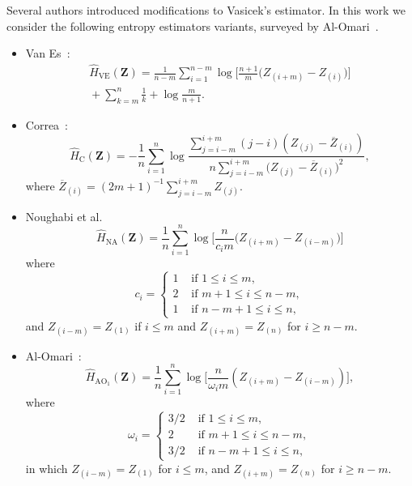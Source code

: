 \documentclass[journal]{IEEEtran}
\begin{document}
Several authors introduced modifications to Vasicek's estimator. 
In this work we consider the following entropy estimators variants, surveyed by Al-Omari~\cite{AlOmari2016}. 
\begin{itemize}
	\item Van Es~\cite{VanEs92}:
	\begin{multline}
		\label{HVE}
		\widehat{H}_\text{VE}(\bm Z)=\frac{1}{n-m} \sum_{i=1}^{n-m}\log{\Big[\frac{n+1}{m}\big(Z_{(i+m)}-Z_{(i)}\big)\Big]} \\
		\mbox{}+\sum_{k=m}^{n} \frac{1}{k}+\log \frac{m}{n+1}.
	\end{multline}
	\item Correa~\cite{Correa95}:
	\begin{equation}
		\widehat{H}_\text{C}(\bm Z)=-\frac{1}{n} \sum_{i=1}^{n} \log \frac{\sum_{j=i-m}^{i+m}(j-i)\left(Z_{(j)}-\overline{Z}_{(i)}\right)}{n \sum_{j=i-m}^{i+m}\big(Z_{(j)}-\overline{Z}_{(i)}\big)^{2}},		
		\label{HC}
	\end{equation}
	where $\overline{Z}_{(i)}=(2 m+1)^{-1} \sum_{j=i-m}^{i+m} Z_{(j)}$.
	\item Noughabi et al.~\cite{Noughabi2010} 
	\label{HNA}
	\begin{equation}
		\widehat{H}_\text{NA}(\bm Z)=\frac{1}{n} \sum_{i=1}^{n} \log \Big[\frac{n}{c_{i} m}\big(Z_{(i+m)}-Z_{(i-m)}\big)\Big]
	\end{equation}
	where 
	\begin{equation*}
		c_{i}=\left\{\begin{array}{ll}
			1 & \text{ if }1 \leq i \leq m, \\
			2 & \text{ if }m+1 \leq i \leq n-m, \\
			1 & \text{ if }n-m+1 \leq i \leq n,
		\end{array}\right.
	\end{equation*}
	and $Z_{(i-m)}=Z_{(1)}$ if $i \leq m$ and $Z_{(i+m)}=Z_{(n)}$ for $i \geq n-m $. 
	\item Al-Omari~\cite{AlOmari2014}:
	\begin{equation}
		\widehat{H}_{{\text{AO}}_1}(\bm Z)=\frac{1}{n} \sum_{i=1}^{n} \log \Big[\frac{n}{\omega_{i} m}\left(Z_{(i+m)}-Z_{(i-m)}\right)\Big], 
		\label{AHE}
	\end{equation}
	where
	\begin{equation*}
		\omega_{i}= \begin{cases}
			3/2 & \text{ if }1 \leq i \leq m, \\
			2 & \text{ if } m+1 \leq i \leq n-m, \\
			3/2 & \text{ if } n-m+1 \leq i \leq n,
		\end{cases}
	\end{equation*}
	in which $Z_{(i-m)}=Z_{(1)}$ for $i \leq m$, and $Z_{(i+m)}=Z_{(n)}$ for $i \geq n-m$. 
	

\end{itemize}
\end{document}
